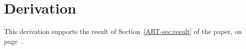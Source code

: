\documentclass{article}
\begin{document}
\section{Derivation}\label{sec:derivation}
This derivation supports the result of Section~\ref{ART-sec:result} of the
paper, on page~\pageref{ART-sec:result}.
\end{document}
